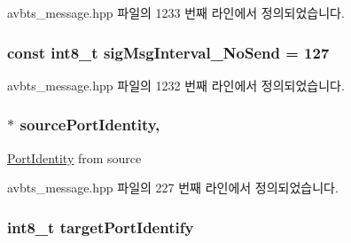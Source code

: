 avbts\+\_\+message.\+hpp 파일의 1233 번째 라인에서 정의되었습니다.

\subsubsection[{\texorpdfstring{sig\+Msg\+Interval\+\_\+\+No\+Send}{sigMsgInterval_NoSend}}]{\setlength{\rightskip}{0pt plus 5cm}const int8\+\_\+t sig\+Msg\+Interval\+\_\+\+No\+Send = 127\hspace{0.3cm}{\ttfamily [static]}}\hypertarget{class_p_t_p_message_signalling_afcb2a19f3190abbb589f24267c8cd636}{}\label{class_p_t_p_message_signalling_afcb2a19f3190abbb589f24267c8cd636}


avbts\+\_\+message.\+hpp 파일의 1232 번째 라인에서 정의되었습니다.

\subsubsection[{\texorpdfstring{source\+Port\+Identity}{sourcePortIdentity}}]{$\ast$ source\+Port\+Identity\hspace{0.3cm}{\ttfamily [protected]}, {\ttfamily [inherited]}}\hypertarget{class_p_t_p_message_common_a415b5544bdd3ea41dae460fa1af900d9}{}\label{class_p_t_p_message_common_a415b5544bdd3ea41dae460fa1af900d9}
\hyperlink{class_port_identity}{Port\+Identity} from source 

avbts\+\_\+message.\+hpp 파일의 227 번째 라인에서 정의되었습니다.

\subsubsection[{\texorpdfstring{target\+Port\+Identify}{targetPortIdentify}}]{\setlength{\rightskip}{0pt plus 5cm}int8\+\_\+t target\+Port\+Identify\hspace{0.3cm}{\ttfamily [private]}}\hypertarget{class_p_t_p_message_signalling_a1d4353212906ed7366ffbf01cb56bdab}{}\label{class_p_t_p_message_signalling_a1d4353212906ed7366ffbf01cb56bdab}


